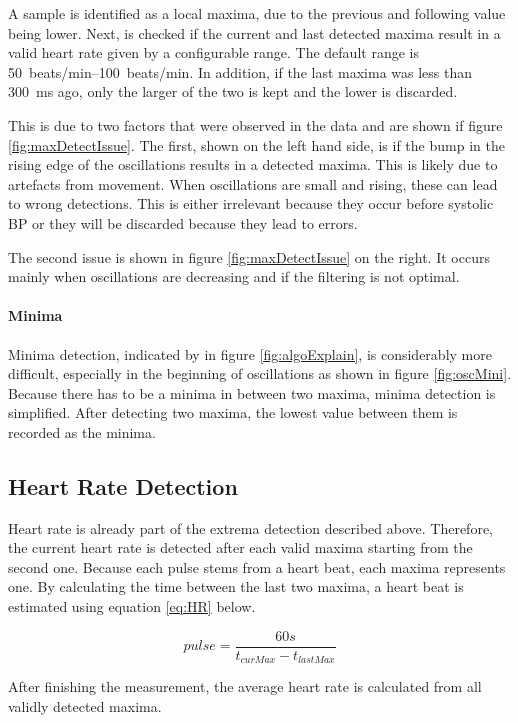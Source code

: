 A sample is identified as a local maxima, due to the previous and following value being lower. Next, is checked if the current and last detected maxima result in a valid heart rate given by a configurable range. The default range is \SIrange{50}{100}{beats/\minute}. In addition, if the last maxima was less than \SI{300}{\milli\second} ago, only the larger of the two is kept and the lower is discarded.

This is due to two factors that were observed in the data and are shown if figure \ref{fig:maxDetectIssue}. The first, shown on the left hand side, is if the bump in the rising edge of the oscillations results in a detected maxima. This is likely due to artefacts from movement. When oscillations are small and rising, these can lead to wrong detections. This is either irrelevant because they occur before systolic BP or they will be discarded because they lead to errors. 

The second issue is shown in figure \ref{fig:maxDetectIssue} on the right. It occurs mainly when oscillations are decreasing and if the filtering is not optimal. 
\paragraph{Minima} Minima detection, indicated by  in figure \ref{fig:algoExplain}, is considerably more difficult, especially in the beginning of oscillations as shown in figure \ref{fig:oscMini}. Because there has to be a minima in between two maxima, minima detection is simplified. After detecting two maxima, the lowest value between them is recorded as the minima.


\subsection{Heart Rate Detection}\label{sec:HR}
Heart rate is already part of the extrema detection described above. Therefore, the current heart rate is detected after each valid maxima starting from the second one. Because each pulse stems from a heart beat, each maxima represents one. By calculating the time between the last two maxima, a heart beat is estimated using equation \ref{eq:HR} below.

\begin{equation}
\label{eq:HR}
pulse=\frac{60s}{t_{curMax} - t_{lastMax}}
\end{equation}

After finishing the measurement, the average heart rate is calculated from all validly detected maxima.


